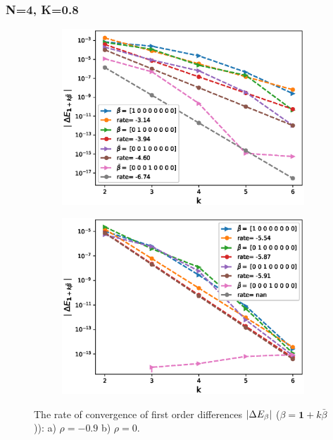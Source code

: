 \documentclass[11pt]{article}
\begin{document}
\newpage
\subsubsection*{N=4, K=0.8 }
\begin{figure}[h!]
\centering
\begin{subfigure}{.5\textwidth}
\centering
\includegraphics[width=1\linewidth]{./figures/effect_rho_differences/H_0_43_K_0_8/N_4/first_difference_rbergomi_4steps_H_043_K_0_8_rho__0_9_with_rate_W1.eps}
\caption{}
\label{fig:sub3}
\end{subfigure}%
\begin{subfigure}{.5\textwidth}
\centering
\includegraphics[width=1\linewidth]{./figures/effect_rho_differences/H_0_43_K_0_8/N_4/first_difference_rbergomi_4steps_H_043_K_0_8_rho_0_with_rate_W1.eps}
\caption{}
\label{fig:sub4}
\end{subfigure}

\caption{The rate of convergence of  first order differences $\left\lvert\Delta E_{\beta}\right\rvert$ ($\beta=\mathbf{1}+k \bar{\beta}$)): a) $\rho=-0.9$ b)  $\rho=0.$}
\label{fig:test2}
\end{figure}
\end{document}
